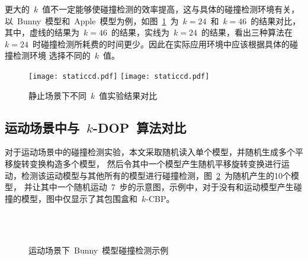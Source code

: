 更大的~$k$~值不一定能够使碰撞检测的效率提高，这与具体的碰撞检测环境有关，以~Bunny~模型和~Apple~模型为例，如图~\ref{fig:chart:exp:kdop:kcbp:k24:k46}~为~$k=24$~和~$k=46$~的结果对比，
其中，虚线的结果为~$k=46$~的结果，实线为~$k=24$~的结果，看出三种算法在~$k=24$~时碰撞检测所耗费的时间更少。因此在实际应用环境中应该根据具体的碰撞检测环境
选择不同的~$k$~值。

\begin{figure}[!ht] 
\centering
{}
{  
   \texttt{[image: staticcd.pdf]}
}
{  
    \texttt{[image: staticcd.pdf]}
}
\caption{静止场景下不同~$k$~值实验结果对比}
\label{fig:chart:exp:kdop:kcbp:k24:k46}
\end{figure}

\subsection{运动场景中与~$k$-DOP~算法对比}
\label{subsec:exper:kdop:kcbp:dynamic}

对于运动场景中的碰撞检测实验，本文采取随机读入单个模型，并随机生成多个平移旋转变换构造多个模型，
然后令其中一个模型产生随机平移旋转变换进行运动，检测该运动模型与其他所有的模型进行碰撞检测，图~\ref{fig:dynamic:cd:bunny}~为随机产生的10个模型，
并让其中一个随机运动~7~步的示意图，示例中，对于没有和运动模型产生碰撞的模型，图中仅显示了其包围盒和~$k$-CBP。

\begin{figure}[!ht]
\centering
{} 
\\ 
\\
\caption{运动场景下~Bunny~模型碰撞检测示例}
\label{fig:dynamic:cd:bunny}
\end{figure}

